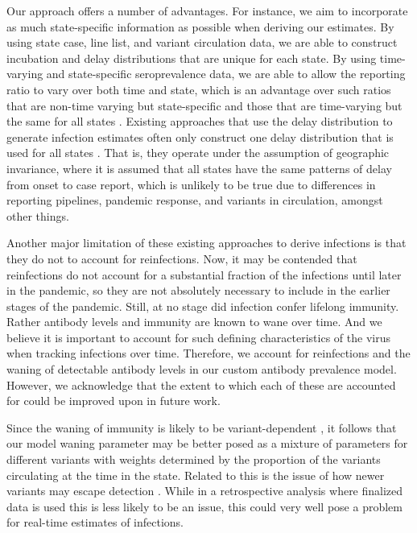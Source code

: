 \documentclass{article}
\begin{document}
Our approach offers a number of advantages.
For instance, we aim to incorporate as much state-specific information as
possible when deriving our estimates. By using state case, line list, and
variant circulation data, we are able to construct incubation and delay distributions
that are unique for each state. By using time-varying and state-specific
seroprevalence data, we are able to allow the reporting ratio to vary over both
time and state, which is an advantage over such ratios that are non-time varying
but state-specific and those that are time-varying but the same for all states
\citep{unwin2020state, uga2020covid19}. 
Existing approaches that use the delay distribution to generate infection
estimates often only construct one delay distribution that is used for all
states \citep{chitwood2022reconstructing, jahja2022real}. That is, they operate
under the assumption of geographic invariance, where it is assumed that all
states have the same patterns of delay from onset to case report,
which is unlikely to be true due to differences in reporting pipelines, pandemic
response, and variants in circulation, amongst other things. 

Another major limitation of these existing approaches to derive infections 
is that they do not to account for reinfections. 
Now, it may be contended that reinfections do not account for a
substantial fraction of the infections until later in the pandemic, so they are
not absolutely necessary to include in the earlier stages of the pandemic.
Still, at no stage did infection confer lifelong immunity.
Rather antibody levels and immunity are known to wane over time. 
And we believe it is important to account for such defining characteristics of the virus when
tracking infections over time. Therefore, we account for reinfections and the waning
of detectable antibody levels in our custom antibody prevalence model. However, we 
acknowledge that the extent to which each of these are accounted for could be
improved upon in future work. 

Since the waning of immunity is likely to be variant-dependent
\citep{pooley2023durability}, it follows that our model waning parameter may be better
posed as a mixture of parameters for different variants with weights determined
by the proportion of the variants circulating at the time in the state. Related
to this is the issue of how newer variants may escape detection
\citep{nih2022assessing, fda2023sars}. While in a retrospective analysis where
finalized data is used this is less likely to be an issue, this could very well
pose a problem for real-time estimates of infections.
\end{document}
